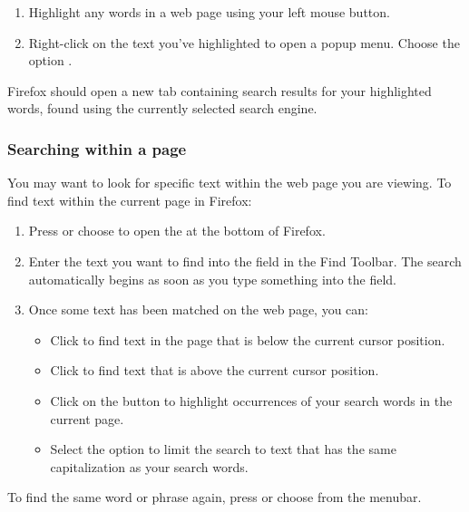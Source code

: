 \begin{enumerate}
  \item Highlight any words in a web page using your left mouse button.
  \item Right-click on the text you've highlighted to open a popup menu.
Choose the option . 
\end{enumerate}

Firefox should open a new tab containing search results for your
highlighted words, found using the currently selected search engine.

\subsubsection{Searching within a page}


You may want to look for specific text within the web page you are viewing.
To find text within the current page in Firefox:

\begin{enumerate}
   \item Press  or choose  to open the 
 at the bottom of Firefox.
   \item Enter the text you want to find into the  field in the
Find Toolbar. The search automatically begins as soon as you type something 
into the field.
   \item Once some text has been matched on the web page, you can:
     \begin{itemize}
       \item Click  to find text in the page that is below the 
current cursor position.
       \item Click  to find text that is above the current 
cursor position.
       \item Click on the  button to highlight 
occurrences of your search words in the current page.
       \item Select the  option to limit the search to 
text that has the same capitalization as your search words.
     \end{itemize}
\end{enumerate}

To find the same word or phrase again, press  or choose 
 from the menubar. 

